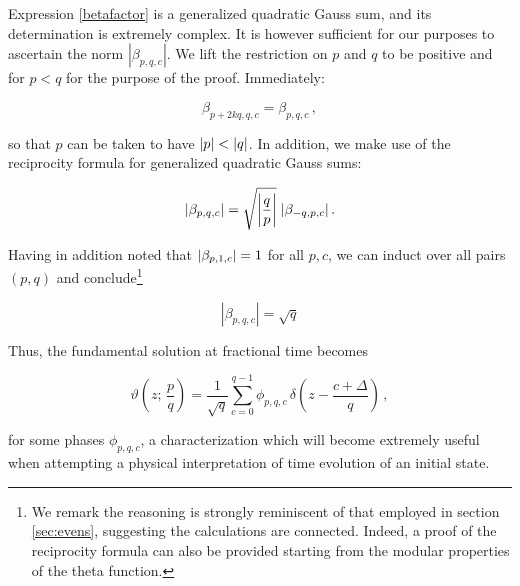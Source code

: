 \documentclass{article}
\newcommand{\cmnt}[1]{\textcolor{red}{\emph{#1}}}
\begin{document}
Expression \eqref{betafactor} is a generalized quadratic Gauss sum, and its determination is extremely complex. It is however sufficient for our purposes to ascertain the norm $|\beta_{p,q,c}|$. We lift the restriction on $p$ and $q$ to be positive and for $p<q$ for the purpose of the proof. Immediately:

\begin{equation}
    \beta_{p+2kq,q,c} = \beta_{p,q,c}\,,
\end{equation}

so that $p$ can be taken to have $\abs{p} < \abs{q}$. In addition, we make use of the reciprocity formula for generalized quadratic Gauss sums\cite{berndt_gauss}:

\begin{equation}
    \abs{\beta_{p,q,c}} = \sqrt{\abs{\frac{q}{p}}} \; \abs{\beta_{-q,p,c}}\,.
\end{equation}

Having in addition noted that $\abs{\beta_{p,1,c}} = 1$ for all $p,c$, we can induct over all pairs $(p,q)$ and conclude\footnote{We remark the reasoning is strongly reminiscent of that employed in section \ref{sec:evens}, suggesting the calculations are connected. Indeed, a proof of the reciprocity formula can also be provided starting from the modular properties of the theta function\cite{berndt_gauss}.}

\begin{equation}
    |\beta_{p,q,c}| = \sqrt{q}
\end{equation}

%
%


Thus, the fundamental solution at fractional time becomes

\begin{equation}\label{finalrationalkernel}
    \vartheta\left( z ; \,\frac{p}{q} \right) = \frac{1}{\sqrt{q}} \sum_{c=0}^{q-1} \phi_{p,q,c} \, \delta \left(z-\frac{c+\Delta}{q}\right)\,,
\end{equation}

for some phases $\phi_{p,q,c}$, a characterization which will become extremely useful when attempting a physical interpretation of time evolution of an initial state.
\end{document}
